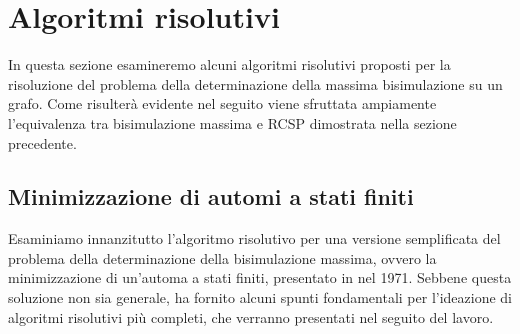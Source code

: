 \section{Algoritmi risolutivi}
In questa sezione esamineremo alcuni algoritmi risolutivi proposti per la risoluzione del problema della determinazione della massima bisimulazione su un grafo. Come risulterà evidente nel seguito viene sfruttata ampiamente l'equivalenza tra bisimulazione massima e RCSP dimostrata nella sezione precedente.

\subsection{Minimizzazione di automi a stati finiti}
Esaminiamo innanzitutto l'algoritmo risolutivo per una versione semplificata del problema della determinazione della bisimulazione massima, ovvero la minimizzazione di un'automa a stati finiti, presentato in \cite{hopcroft} nel 1971. Sebbene questa soluzione non sia generale, ha fornito alcuni spunti fondamentali per l'ideazione di algoritmi risolutivi più completi, che verranno presentati nel seguito del lavoro.

